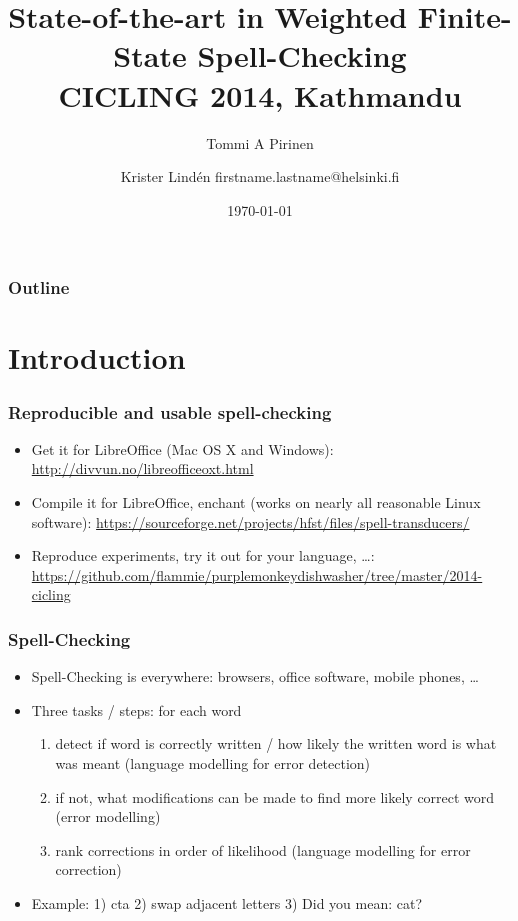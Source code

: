\documentclass[t,12pt]{beamer}
\title{State-of-the-art in Weighted Finite-State Spell-Checking\\
\scriptsize{CICLING 2014, Kathmandu}}
\author{Tommi A Pirinen \and Krister Lindén
\scriptsize \guilsinglleft{}firstname.lastname@helsinki.fi\guilsinglright{}}
\institute{University of Helsinki\\Department of Modern Languages}
\date{\today}
\begin{document}

\HyTitle

\begin{frame}
    \frametitle{Outline}
    \tableofcontents
\end{frame}



\section{Introduction}

\begin{frame}[label=links]
    \frametitle{Reproducible and usable spell-checking}
    \begin{itemize}
        \item Get it for LibreOffice (Mac OS X and Windows):
            \url{http://divvun.no/libreofficeoxt.html}
        \item Compile it for LibreOffice, enchant (works on nearly all
            reasonable Linux software):
            \url{https://sourceforge.net/projects/hfst/files/spell-transducers/}
        \item Reproduce experiments, try it out for your language, \ldots:
            \url{https://github.com/flammie/purplemonkeydishwasher/tree/master/2014-cicling}
    \end{itemize}
\end{frame}
       
\begin{frame}
    \frametitle{Spell-Checking}
    \begin{itemize}
        \item Spell-Checking is everywhere: browsers, office software, mobile
            phones, \ldots
        \item Three tasks / steps: for each word \begin{enumerate}
                \item detect if word is correctly written / how likely the
                    written word is what was meant (language modelling
                    for error detection)
                \item if not, what modifications can be made to find more
                    likely correct word (error modelling)
                \item rank corrections in order of likelihood
                    (language modelling for error correction)
            \end{enumerate}
        \item Example: 1) cta 2) swap adjacent letters 3) Did you mean: cat?
    \end{itemize}
\end{frame}
\end{document}
